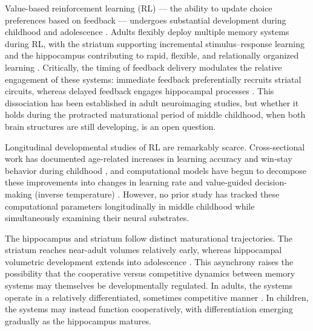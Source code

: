 \documentclass[11pt]{article}
\begin{document}
Value-based reinforcement learning (RL) --- the ability to update choice preferences based on feedback --- undergoes substantial development during childhood and adolescence \citep{nussenbaum2019reinforcement, hartley2016sensitive}. Adults flexibly deploy multiple memory systems during RL, with the striatum supporting incremental stimulus--response learning and the hippocampus contributing to rapid, flexible, and relationally organized learning \citep{poldrack2001interactive, shohamy2008integrating}. Critically, the timing of feedback delivery modulates the relative engagement of these systems: immediate feedback preferentially recruits striatal circuits, whereas delayed feedback engages hippocampal processes \citep{foerde2006modulation}. This dissociation has been established in adult neuroimaging studies, but whether it holds during the protracted maturational period of middle childhood, when both brain structures are still developing, is an open question.

Longitudinal developmental studies of RL are remarkably scarce. Cross-sectional work has documented age-related increases in learning accuracy and win-stay behavior during childhood \citep{palminteri2016computational, decker2016from}, and computational models have begun to decompose these improvements into changes in learning rate and value-guided decision-making (inverse temperature) \citep{master2020disentangling, eckstein2022computational}. However, no prior study has tracked these computational parameters longitudinally in middle childhood while simultaneously examining their neural substrates.

The hippocampus and striatum follow distinct maturational trajectories. The striatum reaches near-adult volumes relatively early, whereas hippocampal volumetric development extends into adolescence \citep{goddings2014influence, gogtay2004dynamic, tamnes2013brain}. This asynchrony raises the possibility that the cooperative versus competitive dynamics between memory systems may themselves be developmentally regulated. In adults, the systems operate in a relatively differentiated, sometimes competitive manner \citep{poldrack2001interactive}. In children, the systems may instead function cooperatively, with differentiation emerging gradually as the hippocampus matures.
\end{document}

